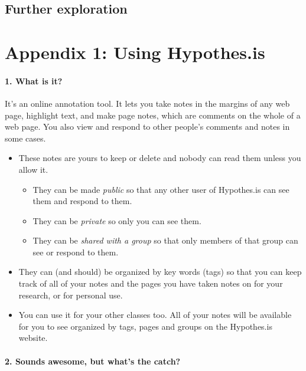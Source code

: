 \documentclass[12pt, openany]{book}
\providecommand{\tightlist}{%
  \setlength{\itemsep}{0pt}\setlength{\parskip}{0pt}}
\begin{document}
\hypertarget{further-exploration-7}{%
\section*{Further exploration}\label{further-exploration-7}}


\hypertarget{appendix-1}{%
\chapter*{Appendix 1: Using Hypothes.is}\label{appendix-1}}


\hypertarget{what-is-it}{%
\subsubsection*{1. What is it?}\label{what-is-it}}


It's an online annotation tool. It lets you take notes in the margins of any web page, highlight text, and make page notes, which are comments on the whole of a web page. You also view and respond to other people's comments and notes in some cases.

\begin{itemize}
\item
  These notes are yours to keep or delete and nobody can read them unless you allow it.

  \begin{itemize}
  \tightlist
  \item
    They can be made \emph{public} so that any other user of Hypothes.is can see them and respond to them.
  \item
    They can be \emph{private} so only you can see them.
  \item
    They can be \emph{shared with a group} so that only members of that group can see or respond to them.
  \end{itemize}
\item
  They can (and should) be organized by key words (tags) so that you can keep track of all of your notes and the pages you have taken notes on for your research, or for personal use.
\item
  You can use it for your other classes too. All of your notes will be available for you to see organized by tags, pages and groups on the Hypothes.is website.
\end{itemize}

\hypertarget{sounds-awesome-but-whats-the-catch}{%
\subsubsection*{2. Sounds awesome, but what's the catch?}\label{sounds-awesome-but-whats-the-catch}}
\end{document}
